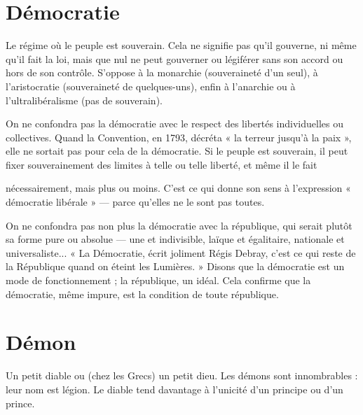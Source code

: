 \section{Démocratie}
Le régime où le peuple est souverain. Cela ne signifie pas
qu’il gouverne, ni même qu’il fait la loi, mais que nul ne
peut gouverner ou légiférer sans son accord ou hors de son contrôle. S’oppose
à la monarchie (souveraineté d’un seul), à l’aristocratie (souveraineté de
quelques-uns), enfin à l'anarchie ou à l’ultralibéralisme (pas de souverain).

On ne confondra pas la démocratie avec le respect des libertés individuelles
ou collectives. Quand la Convention, en 1793, décréta « la terreur jusqu’à la
paix », elle ne sortait pas pour cela de la démocratie. Si le peuple est souverain,
il peut fixer souverainement des limites à telle ou telle liberté, et même il le fait

nécessairement, mais plus ou moins. C’est ce qui donne son sens à l'expression
« démocratie libérale » — parce qu’elles ne le sont pas toutes.

On ne confondra pas non plus la démocratie avec la république, qui serait
plutôt sa forme pure ou absolue — une et indivisible, laïque et égalitaire, nationale
et universaliste... « La Démocratie, écrit joliment Régis Debray, c’est ce
qui reste de la République quand on éteint les Lumières. » Disons que la démocratie
est un mode de fonctionnement ; la république, un idéal. Cela confirme
que la démocratie, même impure, est la condition de toute république.

\section{Démon}
Un petit diable ou (chez les Grecs) un petit dieu. Les démons sont
innombrables : leur nom est légion. Le diable tend davantage à
l'unicité d’un principe ou d’un prince.

